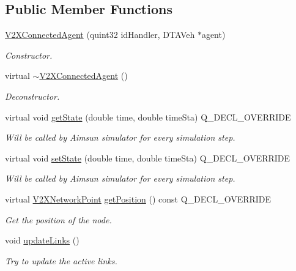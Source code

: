 \subsection*{Public Member Functions}
\begin{DoxyCompactItemize}
\item 
\hyperlink{classV2XConnectedAgent_a0fb86143a5e3f672fd46df6eec4ec7d6}{V2\+X\+Connected\+Agent} (quint32 id\+Handler, D\+T\+A\+Veh $\ast$agent)
\begin{DoxyCompactList}\small\item\em Constructor. \end{DoxyCompactList}\item 
virtual \hyperlink{classV2XConnectedAgent_ade614f612bd195c7e3c06e4cb0d384e9}{$\sim$\+V2\+X\+Connected\+Agent} ()\hypertarget{classV2XConnectedAgent_ade614f612bd195c7e3c06e4cb0d384e9}{}\label{classV2XConnectedAgent_ade614f612bd195c7e3c06e4cb0d384e9}

\begin{DoxyCompactList}\small\item\em Deconstructor. \end{DoxyCompactList}\item 
virtual void \hyperlink{classV2XConnectedAgent_a3c7e42f33c9cb3c25cd2374063f151da}{get\+State} (double time, double time\+Sta) Q\+\_\+\+D\+E\+C\+L\+\_\+\+O\+V\+E\+R\+R\+I\+DE
\begin{DoxyCompactList}\small\item\em Will be called by Aimsun simulator for every simulation step. \end{DoxyCompactList}\item 
virtual void \hyperlink{classV2XConnectedAgent_a771b23c38e5ac18d0219d4d8fefccb5a}{set\+State} (double time, double time\+Sta) Q\+\_\+\+D\+E\+C\+L\+\_\+\+O\+V\+E\+R\+R\+I\+DE
\begin{DoxyCompactList}\small\item\em Will be called by Aimsun simulator for every simulation step. \end{DoxyCompactList}\item 
virtual \hyperlink{classV2XNetworkPoint}{V2\+X\+Network\+Point} \hyperlink{classV2XConnectedAgent_a1bb1360e7658df70cd202e2dbde27d75}{get\+Position} () const Q\+\_\+\+D\+E\+C\+L\+\_\+\+O\+V\+E\+R\+R\+I\+DE
\begin{DoxyCompactList}\small\item\em Get the position of the node. \end{DoxyCompactList}\item 
void \hyperlink{classV2XConnectedAgent_a01b885f68dc2cd464b2900df5182c6b8}{update\+Links} ()\hypertarget{classV2XConnectedAgent_a01b885f68dc2cd464b2900df5182c6b8}{}\label{classV2XConnectedAgent_a01b885f68dc2cd464b2900df5182c6b8}

\begin{DoxyCompactList}\small\item\em Try to update the active links. \end{DoxyCompactList}\end{DoxyCompactItemize}
